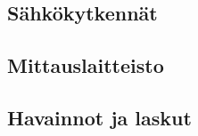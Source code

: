 \documentclass[a4paper,12pt]{article}
\begin{document}


\subsection{Sähkökytkennät}



\subsection{Mittauslaitteisto}


\subsection{Havainnot ja laskut}
\end{document}
